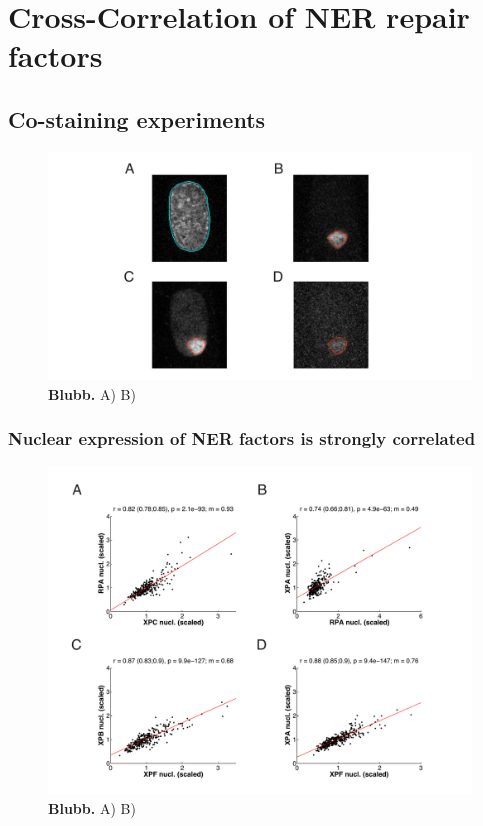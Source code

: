 \chapter{Cross-Correlation of NER repair factors}
\section{Co-staining experiments}

\begin{figure}[htbp]
	\begin{center}
		\includegraphics[width=1\textwidth]{Abbildungen/figure4_1.pdf}
		\caption{\textbf{Blubb.} A) B) }
		\label{fig:coStaining}
	\end{center}
\end{figure}

\subsection{Nuclear expression of NER factors is strongly correlated}

\begin{figure}[htbp]
	\begin{center}
		\includegraphics[width=1\textwidth]{Abbildungen/figure4_2.pdf}
		\caption{\textbf{Blubb.} A) B) }
		\label{fig:coExpressionData}
	\end{center}
\end{figure}


